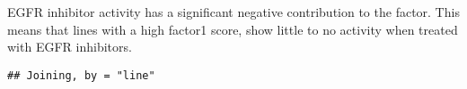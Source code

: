 \documentclass[
]{article}
\newenvironment{Shaded}{\begin{snugshade}}{\end{snugshade}}
\newcommand{\DataTypeTok}[1]{\textcolor[rgb]{0.13,0.29,0.53}{#1}}
\newcommand{\DecValTok}[1]{\textcolor[rgb]{0.00,0.00,0.81}{#1}}
\newcommand{\KeywordTok}[1]{\textcolor[rgb]{0.13,0.29,0.53}{\textbf{#1}}}
\newcommand{\NormalTok}[1]{#1}
\newcommand{\OperatorTok}[1]{\textcolor[rgb]{0.81,0.36,0.00}{\textbf{#1}}}
\newcommand{\StringTok}[1]{\textcolor[rgb]{0.31,0.60,0.02}{#1}}
\begin{document}
EGFR inhibitor activity has a significant negative contribution to the
factor. This means that lines with a high factor1 score, show little to
no activity when treated with EGFR inhibitors.

\begin{Shaded}
\end{Shaded}

\begin{verbatim}
## Joining, by = "line"
\end{verbatim}
\end{document}
